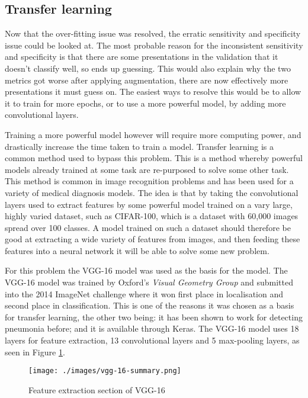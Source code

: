 \documentclass[12pt,a4paper,titlepage,twoside]{report}
\begin{document}
	\subsection{Transfer learning}
	Now that the over-fitting issue was resolved, the erratic sensitivity and specificity issue could be looked at. The most probable reason for the inconsistent sensitivity and specificity is that there are some presentations in the validation that it doesn't classify well, so ends up guessing. This would also explain why the two metrics got worse after applying augmentation, there are now effectively more presentations it must guess on. The easiest ways to resolve this would be to allow it to train for more epochs, or to use a more powerful model, by adding more convolutional layers. \par 
	Training a more powerful model however will require more computing power, and drastically increase the time taken to train a model. Transfer learning is a common method used to bypass this problem. This is a method whereby powerful models already trained at some task are re-purposed to solve some other task. This method is common in image recognition problems and has been used for a variety of medical diagnosis models. The idea is that by taking the convolutional layers used to extract features by some powerful model trained on a vary large, highly varied dataset, such as CIFAR-100, which is a dataset with 60,000 images spread over 100 classes. A model trained on such a dataset should therefore be good at extracting a wide variety of features from images, and then feeding these features into a neural network it will be able to solve some new problem. \par 
	For this problem the VGG-16 model\cite{vgg16} was used as the basis for the model. The VGG-16 model was trained by Oxford's \textit{Visual Geometry Group} and submitted into the 2014 ImageNet challenge where it won first place in localisation and second place in classification. This is one of the reasons it was chosen as a basis for transfer learning, the other two being: it has been shown to work for detecting pneumonia before\cite{cnn-vgg16-for-pne}; and it is available through Keras. The VGG-16 model uses 18 layers for feature extraction, 13 convolutional layers and 5 max-pooling layers, as seen in Figure \ref{fig:vgg16}. \par
	
	\begin{figure}[h]
		\centering
		\texttt{[image: ./images/vgg-16-summary.png]}
		\caption{Feature extraction section of VGG-16}
		\label{fig:vgg16}
	\end{figure}
	
\end{document}
